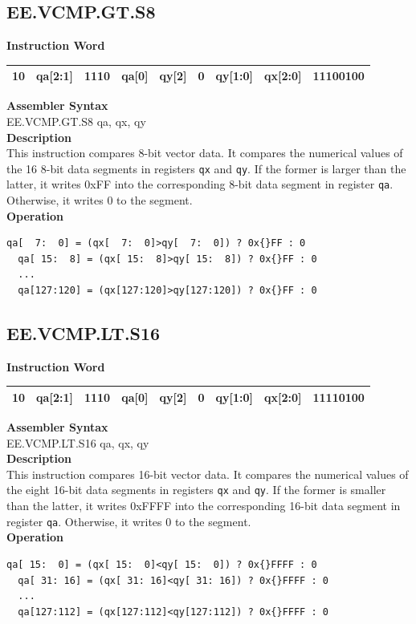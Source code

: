 \clearpage
\subsection{EE.VCMP.GT.S8}\label{instruction:EEVCMPGTS8}
\setlength\tabcolsep{6pt}
\textbf{Instruction Word} \\
\begin{tabular}{|c|c|c|c|c|c|c|c|c|}
	\hline
	10 & qa[2:1] & 1110 & qa[0] & qy[2] & 0 & qy[1:0] & qx[2:0] & 11100100 \\
	\hline
\end{tabular}

\textbf{Assembler Syntax} \\
EE.VCMP.GT.S8 qa, qx, qy \\
\textbf{Description} \\
This instruction compares 8-bit vector data. It compares the numerical values of the 16 8-bit data segments in registers \lstinline{qx} and \lstinline{qy}. If the former is larger than the latter, it writes 0x{}FF into the corresponding 8-bit data segment in register \lstinline{qa}. Otherwise, it writes 0 to the segment.\\
\textbf{Operation}
\begin{lstlisting}[escapeinside=`?]
  qa[  7:  0] = (qx[  7:  0]>qy[  7:  0]) ? 0x{}FF : 0
  qa[ 15:  8] = (qx[ 15:  8]>qy[ 15:  8]) ? 0x{}FF : 0
  ...
  qa[127:120] = (qx[127:120]>qy[127:120]) ? 0x{}FF : 0
\end{lstlisting}

\clearpage
\subsection{EE.VCMP.LT.S16}\label{instruction:EEVCMPLTS16}
\setlength\tabcolsep{6pt}
\textbf{Instruction Word} \\
\begin{tabular}{|c|c|c|c|c|c|c|c|c|}
	\hline
	10 & qa[2:1] & 1110 & qa[0] & qy[2] & 0 & qy[1:0] & qx[2:0] & 11110100 \\
	\hline
\end{tabular}

\textbf{Assembler Syntax} \\
EE.VCMP.LT.S16 qa, qx, qy \\
\textbf{Description} \\
This instruction compares 16-bit vector data. It compares the numerical values of the eight 16-bit data segments in registers \lstinline{qx} and \lstinline{qy}. If the former is smaller than the latter, it writes 0x{}FFFF into the corresponding 16-bit data segment in register \lstinline{qa}. Otherwise, it writes 0 to the segment.\\
\textbf{Operation}
\begin{lstlisting}[escapeinside=`?]
  qa[ 15:  0] = (qx[ 15:  0]<qy[ 15:  0]) ? 0x{}FFFF : 0
  qa[ 31: 16] = (qx[ 31: 16]<qy[ 31: 16]) ? 0x{}FFFF : 0
  ...
  qa[127:112] = (qx[127:112]<qy[127:112]) ? 0x{}FFFF : 0
\end{lstlisting}

